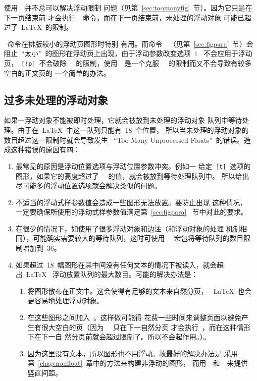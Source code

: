 \begin{description}
	使用~~并不总可以解决浮动限制
	问题（见第~\ref{sec:toomanyfig}~节）。因为它只是在下一页结束前
	才会执行~~命令，而在下一页结束前，未处理的浮动对象
	可能已超过了~\LaTeX{}~的限制。
	
	~命令在排版较小的浮动页图形时特别
	有用。而命令~~（见第~\ref{sec:figpara}~节）会
	阻止~``太小''~的图形在浮动页上出现，由于浮动参数改变选项~\texttt{!}~
	不会应用于浮动页，~\texttt{[!p]}~不会破除~~
	的限制，使用~~是一个克服
	~~的限制而又不会导致有较多空白的正文页的
	一个简单的办法。
\end{description}

\clearpage

\subsection{过多未处理的浮动对象}\label{ssec:toomanyfig}

如果一浮动对象不能被即时处理，它就会被放到未处理的浮动对象
队列中等待处理。由于在~\LaTeX{}~中这一队列只能有~18~个位置，
所以当未处理的浮动对象的数目超过这一限制时就会导致发生
~``Too Many Unprocessed Floats''~的错误。造成这种错误的原因有四：
\begin{enumerate}
	\item 最常见的原因是浮动位置选项与浮动位置参数冲突。例如一
	给定~\texttt{[t]}~选项的图形，如果它的高度超过了
	~~的值，就会被放到等待处理队列中。
	所以给出尽可能多的浮动位置选项就会解决类似的问题。
	\item 不适当的浮动式样参数值会造成一些图形无法放置。要防止出现
	这种情况，一定要确保所使用的浮动式样参数值满足第~\ref{sec:figpara}~
	节中对此的要求。
	\item 在很少的情况下，如使用了很多浮动对象和边注（和浮动对象的处理
	机制相同），可能确实需要较大的等待队列，这时可使用~~
	宏包将等待队列的数目限制增加到~36。
	\item 如果超过~18~幅图形在其中间没有任何文本的情况下被读入，就会超出~\LaTeX{}~
	浮动放置队列的最大数目。可能的解决办法是：
	\begin{enumerate}
		\item 将图形散布在正文中。这会使得有足够的文本来自然分页，
		~\LaTeX{}~也会更容易地处理浮动对象。
		\item 在这些图形之间加入~。这样做可能得
		花费一些时间来调整页面以避免产生有很大空白的页（因为
		~~只在下一自然分页
		才会执行~，而在这种情形下在下一自
		然分页前就会超过限制了。所以不会起作用。）。
		\item 因为这里没有文本，所以图形也不用浮动。故最好的解决办法是
		采用第~\ref{chap:nonfloat}~章中的方法来构建非浮动的图形，
		而用~~和~~来提供竖直间距。
	\end{enumerate}
\end{enumerate}

